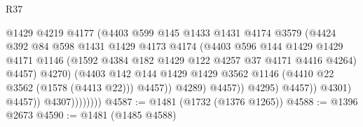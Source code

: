 \begin{lexlean}{R37}
\begin{coremodule}
                                      @1429
                                      @4219
                                      @4177
                                      (@4403
                                        @599
                                        @145
                                        @1433
                                        @1431
                                        @4174
                                        @3579
                                        (@4424
                                          @392
                                          @84
                                          @598
                                          @1431
                                          @1429
                                          @4173
                                          @4174
                                          (@4403
                                            @596
                                            @144
                                            @1429
                                            @1429
                                            @4171
                                            @1146
                                            (@1592
                                              @4384
                                              @182
                                              @1429
                                              @122
                                              @4257
                                              @37
                                              @4171
                                              @4416
                                              @4264)
                                            @4457)
                                          @4270)
                                        (@4403
                                          @142
                                          @144
                                          @1429
                                          @1429
                                          @3562
                                          @1146
                                          (@4410 @22 @3562 (@1578 (@4413 @22)))
                                          @4457))
                                      @4289)
                                    @4457))
                                @4295)
                              @4457))
                          @4301)
                        @4457))
                    @4307))))))))
@4587 := @1481 (@1732 (@1376 @1265))
@4588 := @1396 @2673
@4590 := @1481 (@1485 @4588)

\end{coremodule}
\end{lexlean}
